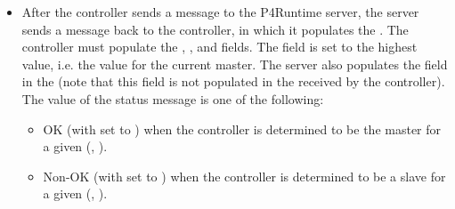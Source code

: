\documentclass[11pt]{article}
\begin{document}
{\begin{itemize}
\item{}
After the controller sends a  message to the P4Runtime
server, the server sends a  message back to the
controller, in which it populates the . The
controller must populate the , , and 
fields. The  field is set to the highest value, i.e. the value
for the current master. The server also populates the  field in the
 (note that this field is not populated in the
 received by the controller). The value of the status
message is one of the following:%

\begin{itemize}[noitemsep,topsep=\mdcompacttopsep]%

\item{}OK (with  set to ) when the controller is
determined to be the master for a given (, ).%

\item{}Non-OK (with  set to ) when the
controller is determined to be a slave for a given (,
).%
\end{itemize}%
\end{itemize}%

}
\end{document}
